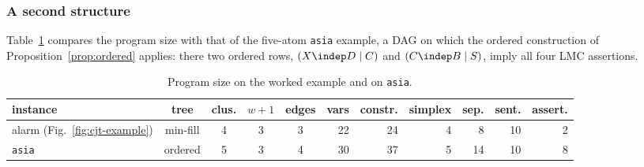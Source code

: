 \subsubsection{A second structure}

Table~\ref{tab:contrast} compares the program size with that of the five-atom
\texttt{asia} example, a DAG on which the ordered construction of
Proposition~\ref{prop:ordered} applies: there two ordered rows,
$(X\indep D\mid C)$ and $(C\indep B\mid S)$, imply all four LMC assertions.

\begin{table}[ht]\centering\small
\caption{Program size on the worked example and on \texttt{asia}.}\label{tab:contrast}
\begin{tabular}{@{}lccccrrrrrr@{}}
\toprule
instance & tree & clus. & $w{+}1$ & edges & vars & constr. & simplex & sep. & sent. & assert. \\
\midrule
alarm (Fig.~\ref{fig:cjt-example}) & min-fill & 4 & 3 & 3 & 22 & 24 & 4 & 8 & 10 & 2 \\
\texttt{asia} & ordered & 5 & 3 & 4 & 30 & 37 & 5 & 14 & 10 & 8 \\
\bottomrule
\end{tabular}
\end{table}

